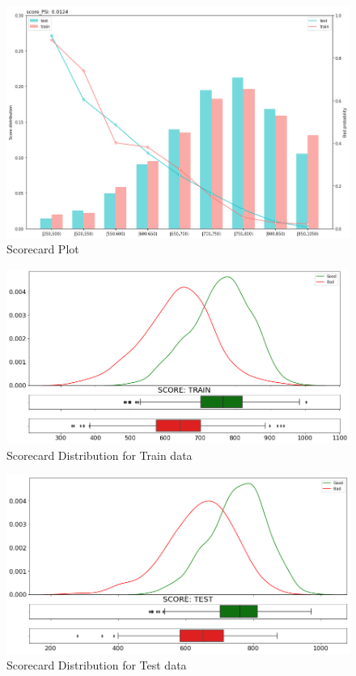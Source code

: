 \begin{landscape}
\begin{figure}[!ht]
\begin{center}
	\includegraphics[scale=0.70]{figs/scorecard_plot.png}
	\caption{Scorecard Plot \label{scorecard_plot}}
\end{center}
\end{figure}
\end{landscape} 

\begin{figure}
\centering
  \centering
  \includegraphics[width=0.9\linewidth]{figs/scorecard_dist_train.png}
  \caption{Scorecard Distribution for Train data}
  \label{fig:sc_dist_train}
\end{figure}

\begin{figure}
\centering
  \centering
  \includegraphics[width=0.9\linewidth]{figs/scorecard_dist_test.png}
  \caption{Scorecard Distribution for Test data}
  \label{fig:sc_dist_test}
\end{figure}
